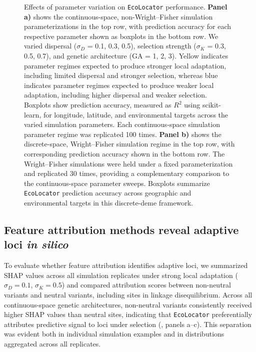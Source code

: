 \documentclass[]{article}
\newcommand{\ecolocator}{\texttt{EcoLocator}\xspace}
\begin{document}
\begin{figure}[H] 
    \caption{Effects of parameter variation on \ecolocator performance. \textbf{Panel a)} 
    shows the continuous-space, non-Wright--Fisher simulation
    parameterizations in the top row, with prediction accuracy for each respective
    parameter shown as boxplots in the bottom row. We varied dispersal
    (\(\sigma_D\) = 0.1, 0.3, 0.5), selection strength
    (\(\sigma_K\) = 0.3, 0.5, 0.7), and genetic architecture
    (GA = 1, 2, 3). Yellow indicates parameter regimes expected to produce
    stronger local adaptation, including limited dispersal and stronger selection,
    whereas blue indicates parameter regimes expected to produce weaker local adaptation, 
    including higher dispersal and weaker selection.
    Boxplots show prediction accuracy, measured as $R^2$ using scikit-learn,
    for longitude, latitude, and environmental targets across the varied
    simulation parameters. Each continuous-space simulation parameter regime
    was replicated 100 times. \textbf{Panel b)} shows the discrete-space,
    Wright--Fisher simulation regime in the top row, with corresponding
    prediction accuracy shown in the bottom row. The Wright--Fisher simulations
    were held under a fixed parameterization and replicated 30 times,
    providing a complementary comparison to the continuous-space parameter
    sweeps. Boxplots summarize \ecolocator prediction accuracy across
    geographic and environmental targets in this discrete-deme framework.} 
    \label{fig:sim-performance}
\end{figure}

\subsection{Feature attribution methods reveal adaptive loci \textit{in silico}}

To evaluate whether feature attribution identifies adaptive loci,
we summarized SHAP values across all simulation replicates under
strong local adaptation ($\sigma_D = 0.1$, $\sigma_K = 0.5$)
and compared attribution scores between non-neutral variants
and neutral variants,
including sites in linkage disequilibrium.
Across all continuous-space genetic architectures,
non-neutral variants consistently received higher SHAP values
than neutral sites,
indicating that \ecolocator preferentially attributes predictive signal
to loci under selection
(, panels a--c).
This separation was evident both in individual simulation examples
and in distributions aggregated across all replicates.
\end{document}
